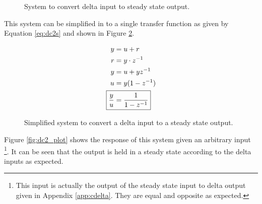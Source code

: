 \documentclass{article}
\begin{document}
\begin{figure}[hpb!]
\begin{center}


\end{center}

\caption{System to convert delta input to steady state output.}
\label{fig:dc1}
\end{figure}

This system can be simplified in to a single transfer function
as given by Equation \ref{eq:dc2s} and shown in Figure \ref{fig:dc1s}.

\begin{align}
	y &= u + r \notag \\
	r &= y \cdot z^{-1} \notag \\
	y &= u + y z^{-1} \notag \\
	u &= y(1 - z^{-1}) \notag \\
	\Aboxed{ \frac{y}{u} &= \frac{1}{1 - z^{-1}} } \label{eq:dc2s}
\end{align}

\begin{figure}[!htbp]
\begin{center}


\end{center}
\caption{Simplified system to convert a delta input to
a steady state output.}
\label{fig:dc1s}
\end{figure}

Figure \ref{fig:dc2_plot} shows the response of this system given
an arbitrary input
\footnote{This input is actually the output of the steady state input
to delta output given in Appendix \ref{app:cdelta}.
They are equal and opposite as expected.}.
It can be seen that the output is held in a steady state according
to the delta inputs as expected.
\end{document}
